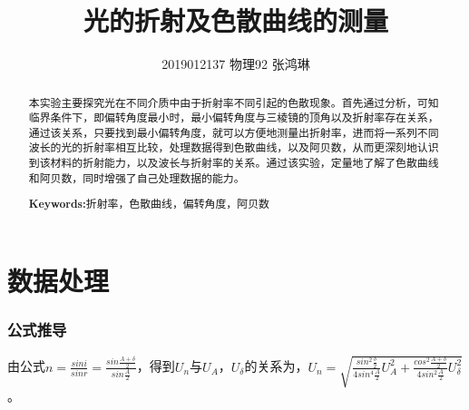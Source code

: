 \documentclass[UTF8]{ctexart}
\begin{document}
\title{光的折射及色散曲线的测量}
\author{2019012137  物理92  张鸿琳}
\maketitle
\begin{abstract}
本实验主要探究光在不同介质中由于折射率不同引起的色散现象。首先通过分析，可知临界条件下，即偏转角度最小时，最小偏转角度与三棱镜的顶角以及折射率存在关系，通过该关系，只要找到最小偏转角度，就可以方便地测量出折射率，进而将一系列不同波长的光的折射率相互比较，处理数据得到色散曲线，以及阿贝数，从而更深刻地认识到该材料的折射能力，以及波长与折射率的关系。通过该实验，定量地了解了色散曲线和阿贝数，同时增强了自己处理数据的能力。

\centering
\textbf{Keywords:}折射率，色散曲线，偏转角度，阿贝数
\end{abstract}

\newpage
\tableofcontents
\newpage

\section{数据处理}
\subsubsection{公式推导}
由公式$n=\frac{sini}{sinr}=\frac{sin\frac{A+\delta}{2}}{sin\frac{A}{2}}$，得到$U_n$与$U_A$，$U_\delta$的关系为，$U_n=\sqrt{\frac{sin^2\frac{\delta}{2}}{4sin^4\frac{A}{2}}U_A^2+\frac{cos^2\frac{A+\delta}{2}}{4sin^2\frac{A}{2}}U_\delta^2}$。
\end{document}

